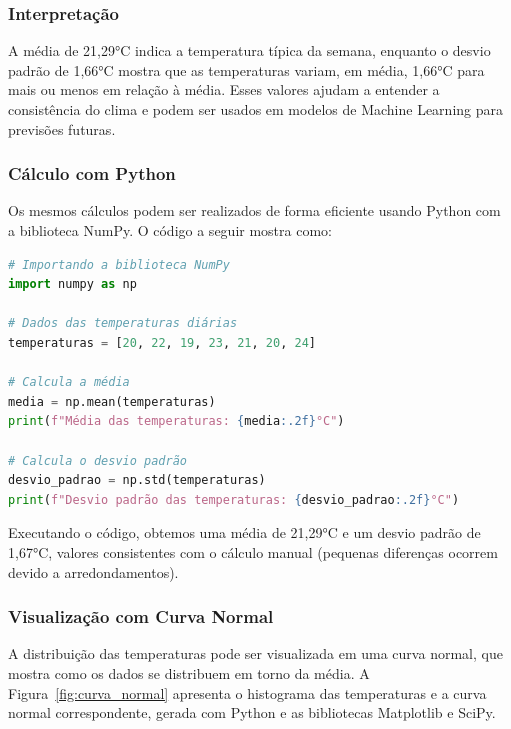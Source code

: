 \documentclass[a4paper,12pt,openany]{book}
\begin{document}
\subsubsection{Interpretação}
A média de 21,29°C indica a temperatura típica da semana, enquanto o desvio padrão de 1,66°C mostra que as temperaturas variam, em média, 1,66°C para mais ou menos em relação à média. Esses valores ajudam a entender a consistência do clima e podem ser usados em modelos de Machine Learning para previsões futuras.

\subsubsection{Cálculo com Python}
Os mesmos cálculos podem ser realizados de forma eficiente usando Python com a biblioteca NumPy. O código a seguir mostra como:

\begin{lstlisting}[language=Python]
# Importando a biblioteca NumPy
import numpy as np
    
# Dados das temperaturas diárias
temperaturas = [20, 22, 19, 23, 21, 20, 24]
    
# Calcula a média
media = np.mean(temperaturas)
print(f"Média das temperaturas: {media:.2f}°C")
    
# Calcula o desvio padrão
desvio_padrao = np.std(temperaturas)
print(f"Desvio padrão das temperaturas: {desvio_padrao:.2f}°C")
\end{lstlisting}    

Executando o código, obtemos uma média de 21,29°C e um desvio padrão de 1,67°C, valores consistentes com o cálculo manual (pequenas diferenças ocorrem devido a 
arredondamentos).
    
\subsubsection{Visualização com Curva Normal}
A distribuição das temperaturas pode ser visualizada em uma curva normal, que mostra como os dados se distribuem em torno da média. A Figura~\ref{fig:curva_normal} apresenta o histograma das temperaturas e a curva normal correspondente, gerada com Python e as bibliotecas Matplotlib e SciPy.
    
\end{document}
